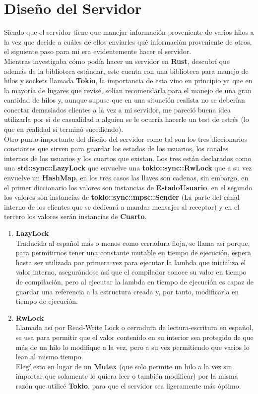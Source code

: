 \documentclass[11pt]{article}
\begin{document}
\section{Diseño del Servidor}
Siendo que el servidor tiene que manejar información proveniente de varios hilos a la vez que decide a cuáles de ellos enviarles qué información proveniente de otros, el siguiente paso para mí era evidentemente hacer el servidor.\\
Mientras investigaba cómo podía hacer un servidor en \textbf{Rust}, descubrí que además de la biblioteca estándar, este cuenta con una biblioteca para manejo de hilos y sockets llamada \textbf{Tokio}, la importancia de esta vino en principio ya que en la mayoría de lugares que revisé, solían recomendarla para el manejo de una gran cantidad de hilos y, aunque supuse que en una situación realista no se deberían conectar demasiados clientes a la vez a mi servidor, me pareció buena idea utilizarla por si de casualidad a alguien se le ocurría hacerle un test de estrés (lo que en realidad sí terminó sucediendo).\\
Otro punto importante del diseño del servidor como tal son los tres diccionarios constantes que sirven para guardar los estados de los usuarios, los canales internos de los usuarios y los cuartos que existan. Los tres están declarados como una \textbf{std::sync::LazyLock} que envuelve una \textbf{tokio::sync::RwLock} que a su vez envuelve un \textbf{HashMap}, en los tres casos las llaves son cadenas, sin embargo, en el primer diccionario los valores son instancias de \textbf{EstadoUsuario}, en el segundo los valores son instancias de \textbf{tokio::sync::mpsc::Sender} (La parte del canal interno de los clientes que se dedicará a mandar mensajes al receptor) y en el tercero los valores serán instancias de \textbf{Cuarto}.
\begin{enumerate}
    \item \textbf{LazyLock}\\
    Traducida al español más o menos como cerradura floja, se llama así porque, para permitirnos tener una constante mutable en tiempo de ejecución, espera hasta ser utilizada por primera vez para ejecutar la lambda que inicializa el valor interno, asegurándose así que el compilador conoce su valor en tiempo de compilación, pero al ejecutar la lambda en tiempo de ejecución es capaz de guardar una referencia a la estructura creada y, por tanto, modificarla en tiempo de ejecución.
    \item \textbf{RwLock}\\
    Llamada así por Read-Write Lock o cerradura de lectura-escritura en español, se usa para permitir que el valor contenido en su interior sea protegido de que más de un hilo lo modifique a la vez, pero a su vez permitiendo que varios lo lean al mismo tiempo.\\
    Elegí esto en lugar de un \textbf{Mutex} (que solo permite un hilo a la vez sin importar que solamente lo quiera leer o también modificar) por la misma razón que utilicé \textbf{Tokio}, para que el servidor sea ligeramente más óptimo.
\end{enumerate}
\end{document}
